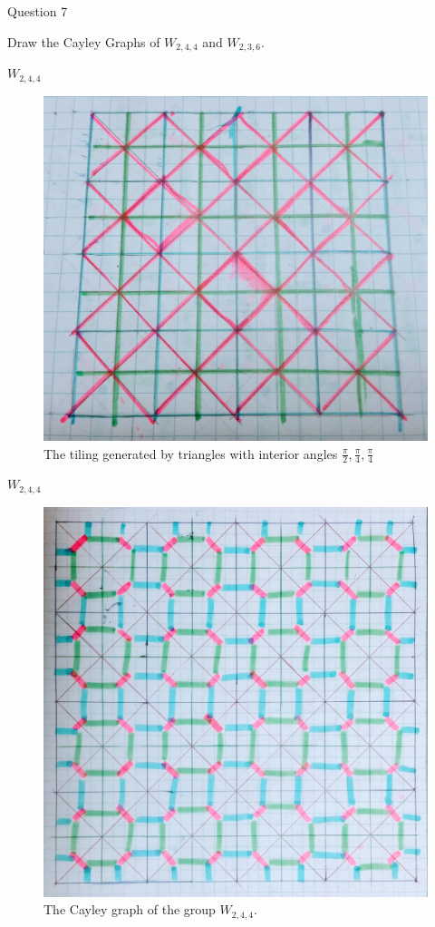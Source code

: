 \documentclass[usenames,dvipsnames]{beamer}
\begin{document}
\begin{frame}{Question 7}

Draw the Cayley Graphs of $W_{2,4,4}$ and $W_{2,3,6}$.

\end{frame}

\begin{frame}{$W_{2,4,4}$}

\begin{figure}[h]
    \centering
    \includegraphics[width=.5\textwidth]{images/7-03-W_244_tiling.png}
    \caption{The tiling generated by triangles with interior angles $\frac{\pi}{2},\frac{\pi}{4},\frac{\pi}{4}$}
\end{figure}

\end{frame}

\begin{frame}{$W_{2,4,4}$}

\begin{figure}[h]
    \centering
    \includegraphics[width=.5\textwidth]{images/7-04-W_244_cayley_graph.png}
    \caption{The Cayley graph of the group $W_{2,4,4}$.}
\end{figure}

\end{frame}
\end{document}
